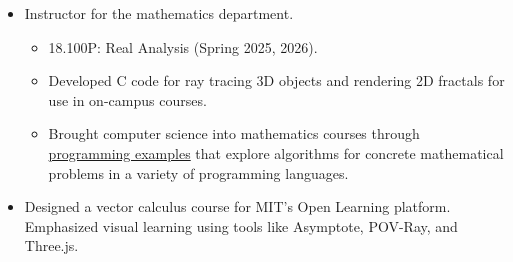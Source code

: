 \documentclass[letterpaper,sans]{moderncv}
\begin{document}
            {%
                \begin{itemize}
                    \item
                        Instructor for the mathematics department.
                        \begin{itemize}
                            \item
                                18.100P: Real Analysis (Spring 2025, 2026).
                            \item
                                Developed C code for ray tracing 3D objects
                                and rendering 2D fractals for use in
                                on-campus courses.
                            \item
                                Brought computer science into mathematics
                                courses through
                                \href{%
                                    https://github.com/ryanmaguire/%
                                        mitx_mathematics_programming_examples%
                                }{programming examples}
                                that explore algorithms for concrete
                                mathematical problems in a variety of
                                programming languages.
                        \end{itemize}
                    \item
                        Designed a vector calculus course for MIT's Open
                        Learning platform. Emphasized visual learning
                        using tools like Asymptote, POV-Ray, and Three.js.
                \end{itemize}
            }
\end{document}
